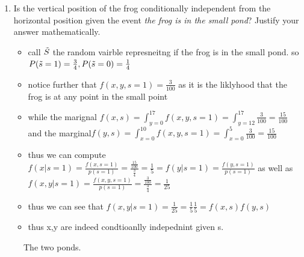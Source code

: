 \documentclass[12pt,twoside]{article}
\begin{document}
\begin{enumerate}
\begin{enumerate}
\item Is the vertical position of the frog conditionally independent from the horizontal position given the event \emph{the frog is in the small pond}? Justify your answer mathematically. 
\begin{itemize}
    \item call $\Tilde{S}$ the random vairble represneitng if the frog is in the small pond. so $P(\Tilde{s}=1)=\frac{3}{4},P(\Tilde{s}=0)=\frac{1}{4}$ 
    \item notice further that $f(x,y,s=1)=\frac{3}{100}$ as it is the liklyhood that the frog is at any point in the small point 
    \item while the marignal $f(x,s)=\int_{y=0}^{17}f(x,y,s=1)=\int_{y=12}^{17}\frac{3}{100}=\frac{15}{100}$ and the marginal$f(y,s)=\int_{x=0}^{10}f(x,y,s=1)=\int_{x=0}^{5}\frac{3}{100}=\frac{15}{100}$
    \item thus we can compute $f(x|s=1)=\frac{f(x,s=1)}{p(s=1)}=\frac{\frac{15}{100}}{\frac{3}{4}}=\frac{1}{5}=f(y|s=1)=\frac{f(y,s=1)}{p(s=1)}$ as well as $f(x,y|s=1)=\frac{f(x,y,s=1)}{p(s=1)}=\frac{\frac{3}{100}}{\frac{3}{4}}=\frac{1}{25}$
    \item thus we can see that $f(x,y|s=1)=\frac{1}{25}=\frac{1}{5}\frac{1}{5}=f(x,s)f(y,s)$ 
    \item thus x,y are indeed condtioanlly indepednint given s.
\end{itemize}


\end{enumerate}
\begin{figure}[h]
\begin{center}
\end{center}
\caption{The two ponds.}
\label{fig:garden}
\end{figure}


\end{enumerate}
\end{document}
